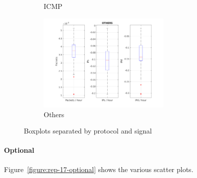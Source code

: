 \documentclass{article}
\begin{document}
\begin{figure}[h]
\begin{subfigure}{.5\textwidth}
        \caption{ICMP}
    \end{subfigure}
    \begin{subfigure}{.5\textwidth}
        \centering
        \includegraphics[width=0.7\textwidth]{../exercise-3/plots/rep_17_OTHERS}
        \caption{Others}
    \end{subfigure}
    \caption{\label{figure:rep-17} Boxplots separated by protocol and signal}
\end{figure}

\paragraph{Optional}

Figure~\ref{figure:rep-17-optional} shows the various scatter plots.
\end{document}
